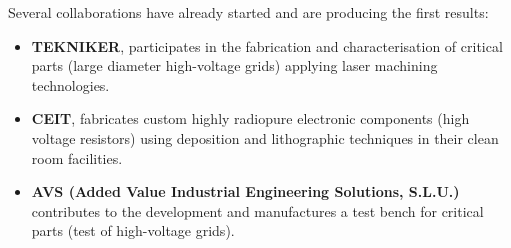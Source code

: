 \documentclass[12pt,a4paper,article]{report} %
\begin{document}
Several collaborations have already started and are producing the first results:
\begin{itemize}
\item \textbf{ TEKNIKER}, participates in the fabrication and characterisation of critical parts (large diameter high-voltage grids)  applying laser machining technologies. 
\item \textbf{ CEIT}, fabricates custom highly radiopure electronic components (high voltage resistors) using deposition and lithographic techniques in their clean room facilities. 
\item \textbf{AVS (Added Value Industrial Engineering Solutions, S.L.U.)} contributes to the development and manufactures a test bench for critical parts (test of high-voltage grids).
\end{itemize}
\end{document}

